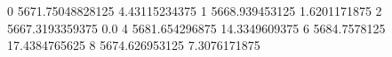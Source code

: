 0 5671.75048828125 4.43115234375
1 5668.939453125 1.6201171875
2 5667.3193359375 0.0
4 5681.654296875 14.3349609375
6 5684.7578125 17.4384765625
8 5674.626953125 7.3076171875
